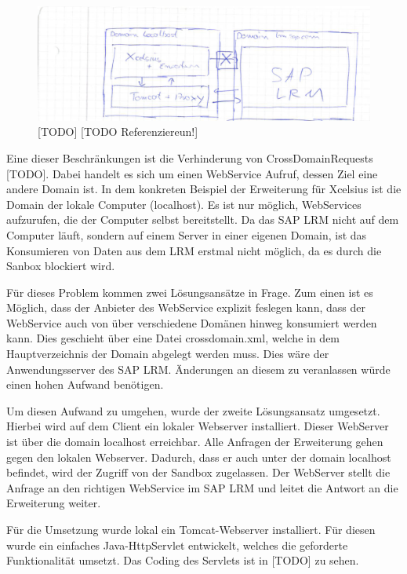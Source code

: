 \begin{figure}[h]
\centering
\setlength{\unitlength}{1mm}
\includegraphics[width=15cm]{images/flex_sandbox.png}
\caption{[TODO] [TODO Referenziereun!] \label{[TODO]}}
\end{figure}

Eine dieser Beschränkungen ist die Verhinderung von CrossDomainRequests [TODO]. Dabei handelt es sich um einen WebService Aufruf, dessen Ziel eine andere Domain ist. In dem konkreten Beispiel der Erweiterung für Xcelsius ist die Domain der lokale Computer (localhost). Es ist nur möglich, WebServices aufzurufen, die der Computer selbst bereitstellt. Da das SAP LRM nicht auf dem Computer läuft, sondern auf einem Server in einer eigenen Domain, ist das Konsumieren von Daten aus dem LRM erstmal nicht möglich, da es durch die Sanbox blockiert wird.

Für dieses Problem kommen zwei Lösungsansätze in Frage. Zum einen ist es Möglich, dass der Anbieter des WebService explizit feslegen kann, dass der WebService auch von über verschiedene Domänen hinweg konsumiert werden kann. Dies geschieht über eine Datei crossdomain.xml, welche in dem Hauptverzeichnis der Domain abgelegt werden muss. Dies wäre der Anwendungsserver des SAP LRM. Änderungen an diesem zu veranlassen würde einen hohen Aufwand benötigen. 

Um diesen Aufwand zu umgehen, wurde der zweite Lösungsansatz umgesetzt. Hierbei wird auf dem Client ein lokaler Webserver installiert. Dieser WebServer ist über die domain localhost erreichbar. Alle Anfragen der Erweiterung gehen gegen den lokalen Webserver. Dadurch, dass er auch unter der domain localhost befindet, wird der Zugriff von der Sandbox zugelassen. Der WebServer stellt die Anfrage an den richtigen WebService im SAP LRM und leitet die Antwort an die Erweiterung weiter.

Für die Umsetzung wurde lokal ein Tomcat-Webserver installiert. Für diesen wurde ein einfaches Java-HttpServlet entwickelt, welches die geforderte Funktionalität umsetzt. Das Coding des Servlets ist in [TODO] zu sehen.

